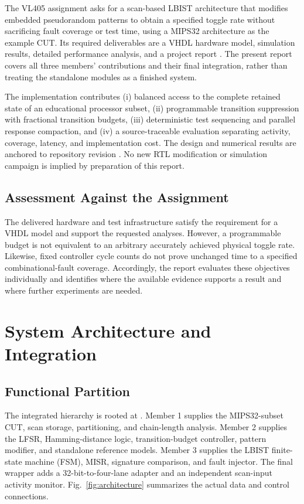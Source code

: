 \documentclass[conference,a4paper]{IEEEtran}
\newcommand{\rtl}[1]{\texttt{\detokenize{#1}}}
\begin{document}
The VL405 assignment asks for a scan-based LBIST architecture that modifies
embedded pseudorandom patterns to obtain a specified toggle rate without
sacrificing fault coverage or test time, using a MIPS32 architecture as the
example CUT. Its required deliverables are a VHDL hardware model, simulation
results, detailed performance analysis, and a project report \cite{assignment}.
The present report covers all three members' contributions and their final
integration, rather than treating the standalone modules as a finished system.

The implementation contributes (i) balanced access to the complete retained
state of an educational processor subset, (ii) programmable transition
suppression with fractional transition budgets, (iii) deterministic test
sequencing and parallel response compaction, and (iv) a source-traceable
evaluation separating activity, coverage, latency, and implementation cost.
The design and numerical results are anchored to repository revision
\rtl{bc81786} \cite{repository}. No new RTL modification or simulation campaign
is implied by preparation of this report.

\subsection{Assessment Against the Assignment}
The delivered hardware and test infrastructure satisfy the requirement for a
VHDL model and support the requested analyses. However, a programmable budget
is not equivalent to an arbitrary accurately achieved physical toggle rate.
Likewise, fixed controller cycle counts do not prove unchanged time to a
specified combinational-fault coverage. Accordingly, the report evaluates
these objectives individually and identifies where the available evidence
supports a result and where further experiments are needed.

\section{System Architecture and Integration}
\subsection{Functional Partition}
The integrated hierarchy is rooted at \rtl{lbist_mips32_top}. Member 1 supplies
the MIPS32-subset CUT, scan storage, partitioning, and chain-length analysis.
Member 2 supplies the LFSR, Hamming-distance logic, transition-budget controller,
pattern modifier, and standalone reference models. Member 3 supplies the LBIST
finite-state machine (FSM), MISR, signature comparison, and fault injector.
The final wrapper adds a 32-bit-to-four-lane adapter and an independent
scan-input activity monitor. Fig.~\ref{fig:architecture} summarizes the actual
data and control connections.
\end{document}
